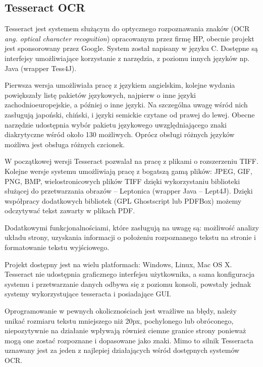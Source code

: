 \documentclass[a4paper,12pt]{article}
\newcommand\spacingIndent{2.2em}
\begin{document}
        
        
	\subsection{Tesseract OCR}
	    \hspace{\spacingIndent} Tesseract jest systemem służącym do optycznego rozpoznawania znaków (OCR \textit{ang. optical character recognition}) 
			opracowanym przez firmę HP, obecnie projekt jest sponsorowany przez Google. System został napisany w języku C. 
			Dostępne są interfejsy umożliwiające korzystanie z narzędzia, z poziomu innych języków np. Java (wrapper Tess4J). 
			
			 Pierwsza wersja umożliwiała pracę z językiem angielskim, kolejne wydania powiększały listę pakietów językowych, 
			najpierw o inne języki zachodnioeuropejskie, a później o inne języki. Na szczególna uwagę wśród nich zasługują japoński, chiński, 
			i języki semickie czytane od prawej do lewej. Obecne narzędzie udostępnia wybór pakietu językowego uwzględniającego 
			znaki diakrytyczne wśród około 130 możliwych. Oprócz obsługi różnych języków możliwa jest obsługa różnych czcionek. 
			
			W początkowej wersji Tesseract pozwalał na pracę z plikami o rozszerzeniu TIFF. Kolejne wersje systemu umożliwiają pracę z bogatszą gamą plików: 
			JPEG, GIF, PNG, BMP, wielostronicowych plików TIFF dzięki wykorzystaniu biblioteki służącej do przetwarzania obrazów -- Leptonica 
			(wrapper Java -- Lept4J). Dzięki współpracy dodatkowych bibliotek (GPL Ghostscript lub PDFBox) możemy odczytywać tekst zawarty w plikach PDF. 
			
			Dodatkowymi funkcjonalnościami, które zasługują na uwagę są: możliwość analizy układu strony, uzyskania informacji o położeniu rozpoznanego tekstu na stronie 
			i formatowanie tekstu wyjściowego. 
			
			Projekt dostępny jest na wielu platformach: Windows, Linux, Mac OS X. Tesseract nie udostępnia graficznego interfejsu użytkownika, 
			a sama konfiguracja systemu i przetwarzanie danych odbywa się z poziomu konsoli, powstały jednak systemy wykorzystujące tesseracta i posiadające GUI. 
			
			Oprogramowanie w pewnych okolicznościach jest wrażliwe na błędy, należy unikać rozmiaru tekstu mniejszego niż 20px, pochylonego lub obróconego, 
			niepozytywnie na działanie wpływają również ciemne granice strony ponieważ mogą one zostać rozpoznane i dopasowane jako znaki. Mimo to silnik Tesseracta uznawany jest za jeden z najlepiej działających wśród dostępnych systemów OCR. 
\end{document}
